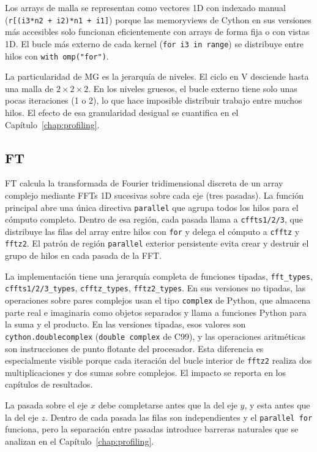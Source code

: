 Los arrays de malla se representan como vectores 1D con indexado manual
(\texttt{r[(i3*n2 + i2)*n1 + i1]}) porque las memoryviews de Cython en sus
versiones más accesibles solo funcionan eficientemente con arrays de forma fija
o con vistas 1D. El bucle más externo de cada kernel (\texttt{for i3 in range})
se distribuye entre hilos con \texttt{with omp("for")}.

La particularidad de MG es la jerarquía de niveles. El ciclo en V desciende hasta
una malla de $2 \times 2 \times 2$. En los niveles gruesos, el bucle externo
tiene solo unas pocas iteraciones (1 o 2), lo que hace imposible distribuir
trabajo entre muchos hilos. El efecto de esa granularidad desigual se cuantifica
en el Capítulo~\ref{chap:profiling}.

\subsection{FT}
FT calcula la transformada de Fourier tridimensional discreta de un array
complejo mediante FFTs 1D sucesivas sobre cada eje (tres pasadas). La función
principal abre una única directiva \texttt{parallel} que agrupa todos los
hilos para el cómputo completo. Dentro de esa región, cada pasada llama a
\texttt{cffts1/2/3}, que distribuye las filas del array entre hilos con
\texttt{for} y delega el cómputo a \texttt{cfftz} y \texttt{fftz2}. El patrón
de región \texttt{parallel} exterior persistente evita crear y destruir el
grupo de hilos en cada pasada de la FFT.

La implementación tiene una jerarquía completa de funciones tipadas,
\texttt{fft\_types}, \texttt{cffts1/2/3\_types}, \texttt{cfftz\_types},
\texttt{fftz2\_types}. En sus versiones no tipadas, las operaciones sobre pares
complejos usan el tipo \texttt{complex} de Python, que almacena parte real e
imaginaria como objetos separados y llama a funciones Python para la suma y el
producto. En las versiones tipadas, esos valores son \texttt{cython.doublecomplex}
(\texttt{double complex} de C99), y las operaciones aritméticas son instrucciones
de punto flotante del procesador. Esta diferencia es especialmente visible
porque cada iteración del bucle interior de \texttt{fftz2} realiza dos
multiplicaciones y dos sumas sobre complejos. El impacto se reporta en los
capítulos de resultados.

La pasada sobre el eje $x$ debe completarse antes que la del eje $y$, y esta
antes que la del eje $z$. Dentro de cada pasada las filas son independientes y el
\texttt{parallel~for} funciona, pero la separación entre pasadas introduce
barreras naturales que se analizan en el Capítulo~\ref{chap:profiling}.
